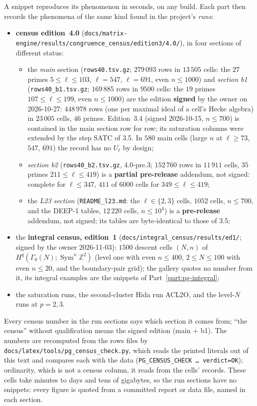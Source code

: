 \documentclass[11pt]{article}
\newcommand{\Z}{\mathbb{Z}}
\newcommand{\Sym}{\operatorname{Sym}}
\newcommand{\Ga}{\Gamma}
\newcommand{\code}[1]{\texttt{#1}}
\newcommand{\file}[1]{\texttt{#1}}
\newcommand{\pfile}[1]{\nolinkurl{#1}}
\begin{document}
A snippet reproduces its phenomenon in seconds, on any build. Each part then records the phenomena of the same kind found in the project's \emph{runs}:
\begin{itemize}[leftmargin=1.6em,itemsep=1pt]
\item \textbf{census edition~4.0} (\pfile{docs/matrix-engine/results/congruence_census/edition3/4.0/}), in four sections of different status:
  \begin{itemize}[itemsep=0pt]
  \item the \emph{main} section (\pfile{rows40.tsv.gz}; $279\,093$ rows in $13\,505$ cells: the $27$ primes $5\le\ell\le103$, $\ell=547$, $\ell=691$,
    even $n\le1000$) and \emph{section b1} (\pfile{rows40_b1.tsv.gz}; $169\,885$ rows in $9500$ cells: the $19$ primes $107\le\ell\le199$, even
    $n\le1000$) are the edition \textbf{signed} by the owner on 2026-10-27: $448\,978$ rows (one per maximal ideal of a cell's Hecke algebra) in
    $23\,005$ cells, $46$ primes. Edition~3.4 (signed 2026-10-15, $n\le700$) is contained in the main section row for row; its saturation
    columns were extended by the step SATC of 3.5. In $580$ main cells (large $n$ at $\ell\ge73$, $547$, $691$) the record has no $U_\ell$ by design;
  \item \emph{section b2} (\pfile{rows40_b2.tsv.gz}, 4.0-pre.3; $152\,760$ rows in $11\,911$ cells, $35$ primes $211\le\ell\le419$) is a
    \textbf{partial pre-release} addendum, not signed: complete for $\ell\le347$, $411$ of $6000$ cells for $349\le\ell\le419$;
  \item the \emph{L23 section} (\pfile{README_l23.md}: the $\ell\in\{2,3\}$ cells, $1052$ cells, $n\le700$, and the DEEP-1 tables, $12\,220$
    cells, $n\le10^{4}$) is a \textbf{pre-release} addendum, not signed; its tables are byte-identical to those of 3.5;
  \end{itemize}
\item the \textbf{integral census, edition~1} (\pfile{docs/integral_census/results/ed1/}; signed by the owner 2026-11-03): $1500$ descent cells
  $(N,n)$ of $H^{q}(\Ga_0(N);\Sym^{n}\Z^{2})$ (level one with even $n\le400$, $2\le N\le100$ with even $n\le20$, and the boundary-pair grid);
  the gallery quotes no number from it, its integral examples are the snippets of Part~\ref{part:pg-integral};
\item the saturation runs, the second-cluster Hida run ACL2O, and the level-$N$ runs at $p=2,3$.
\end{itemize}
Every census number in the run sections says which section it comes from; ``the census'' without qualification means the signed edition
(main $+$ b1). The numbers are recomputed from the rows files by \file{docs/latex/tools/pg\_census\_check.py}, which reads the printed literals out of this text and compares each with the data (\code{PG\_CENSUS\_CHECK \dots{} verdict=OK}); ordinarity, which is not a census column, it reads from the cells' records.
These cells take minutes to days and tens of gigabytes, so the run sections have no snippets: every figure is quoted from a committed report or
data file, named in each section.
\end{document}
